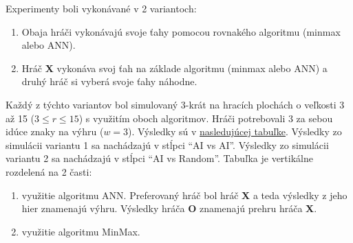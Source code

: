 Experimenty boli vykonávané v 2 variantoch:
\begin{enumerate}
    \item Obaja hráči vykonávajú svoje ťahy pomocou rovnakého algoritmu (minmax alebo ANN).
    \item Hráč \textbf{X} vykonáva svoj ťah na základe algoritmu (minmax alebo ANN) a druhý hráč si vyberá svoje ťahy náhodne.
\end{enumerate}
Každý z týchto variantov bol simulovaný 3-krát na hracích plochách o veľkosti 3 až 15 ($3 \leq r \leq 15$) s využitím oboch algoritmov.
Hráči potrebovali 3 za sebou idúce znaky na výhru ($w = 3$).
Výsledky sú v \hyperref[table:experiments-boards]{nasledujúcej tabuľke}.
Výsledky zo simulácii variantu 1 sa nachádzajú v stĺpci \enquote{AI vs AI}.
Výsledky zo simulácii variantu 2 sa nachádzajú v stĺpci \enquote{AI vs Random}.
Tabuľka je vertikálne rozdelená na 2 časti:
\begin{enumerate}
    \item využitie algoritmu ANN.
    Preferovaný hráč bol hráč \textbf{X} a teda výsledky z jeho hier znamenajú výhru.
    Výsledky hráča \textbf{O} znamenajú prehru hráča \textbf{X}.
    \item využitie algoritmu MinMax.
\end{enumerate}

